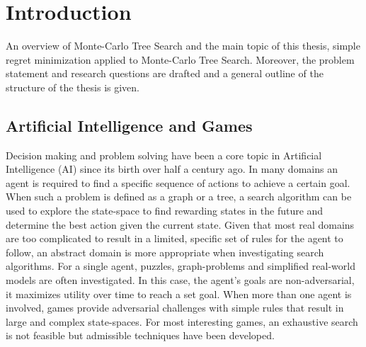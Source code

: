 \documentclass{kecsmstr}
\begin{document}
\tableofcontents  \emptypage 
\listofalgorithms \emptypage
{}

\chapter{Introduction}

\begin{chaptercontents} An overview of Monte-Carlo Tree Search and the main topic of this thesis, simple regret minimization applied to Monte-Carlo Tree Search. Moreover, the problem statement and research questions are drafted and a general outline of the structure of the thesis is given.
\end{chaptercontents}

\section{Artificial Intelligence and Games}
Decision making and problem solving have been a core topic in Artificial Intelligence (AI) since its birth over half a century ago. In many domains an agent is required to find a specific sequence of actions to achieve a certain goal. When such a problem is defined as a graph or a tree, a search algorithm can be used to explore the state-space to find rewarding states in the future and determine the best action given the current state.
Given that most real domains are too complicated to result in a limited, specific set of rules for the agent to follow, an abstract domain is more appropriate when investigating search algorithms. For a single agent, puzzles, graph-problems and simplified real-world models are often investigated. In this case, the agent's goals are non-adversarial, it maximizes utility over time to reach a set goal. When more than one agent is involved, games provide adversarial challenges with simple rules that result in large and complex state-spaces. For most interesting games, an exhaustive search is not feasible but admissible techniques have been developed.
\end{document}
